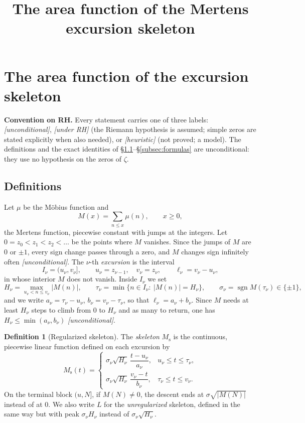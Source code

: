\documentclass[11pt,reqno]{amsart}
\theoremstyle{plain}
\theoremstyle{definition}
\newtheorem{definition}[theorem]{Definition}
\DeclareMathOperator{\sgn}{sgn}
\newcommand{\Ms}{M_{\mathrm{s}}}
\begin{document}
\title{The area function of the Mertens excursion skeleton}
\author{}
\date{}
\maketitle

\section{The area function of the excursion skeleton}
\label{sec:excursion-area}

\noindent\textbf{Convention on RH.} Every statement carries one of three
labels: \emph{[unconditional]}, \emph{[under RH]} (the Riemann hypothesis is
assumed; simple zeros are stated explicitly when also needed), or
\emph{[heuristic]} (not proved; a model). The definitions and the exact
identities of \S\ref{subsec:def}--\S\ref{subsec:formulas} are
unconditional: they use no hypothesis on the zeros of $\zeta$.

\subsection{Definitions}
\label{subsec:def}

Let $\mu$ be the Möbius function and
\[
  M(x)=\sum_{n\le x}\mu(n),\qquad x\ge 0,
\]
the Mertens function, piecewise constant with jumps at the integers. Let
$0=z_0<z_1<z_2<\dots$ be the points where $M$ vanishes. Since the jumps of
$M$ are $0$ or $\pm1$, every sign change passes through a zero, and $M$
changes sign infinitely often \emph{[unconditional]}. The $\nu$-th
\emph{excursion} is the interval
\[
  I_\nu=(u_\nu,v_\nu],\qquad u_\nu=z_{\nu-1},\quad v_\nu=z_\nu,
  \qquad \ell_\nu=v_\nu-u_\nu ,
\]
in whose interior $M$ does not vanish. Inside $I_\nu$ we set
\[
  H_\nu=\max_{u_\nu<n\le v_\nu}|M(n)|,\qquad
  \tau_\nu=\min\{n\in I_\nu:\ |M(n)|=H_\nu\},\qquad
  \sigma_\nu=\sgn M(\tau_\nu)\in\{\pm1\},
\]
and we write $a_\nu=\tau_\nu-u_\nu$, $b_\nu=v_\nu-\tau_\nu$, so that
$\ell_\nu=a_\nu+b_\nu$. Since $M$ needs at least $H_\nu$ steps to climb from
$0$ to $H_\nu$ and as many to return, one has
$H_\nu\le\min(a_\nu,b_\nu)$ \emph{[unconditional]}.

\begin{definition}[Regularized skeleton]
\label{def:Ms}
The \emph{skeleton} $\Ms$ is the continuous, piecewise linear function
defined on each excursion by
\[
  \Ms(t)=
  \begin{cases}
    \sigma_\nu\sqrt{H_\nu}\,\dfrac{t-u_\nu}{a_\nu}, & u_\nu\le t\le \tau_\nu,\\[2ex]
    \sigma_\nu\sqrt{H_\nu}\,\dfrac{v_\nu-t}{b_\nu}, & \tau_\nu\le t\le v_\nu .
  \end{cases}
\]
On the terminal block $(u,N]$, if $M(N)\neq0$, the descent ends at
$\sigma\sqrt{|M(N)|}$ instead of at $0$. We also write $L$ for the
\emph{unregularized} skeleton, defined in the same way but with peak
$\sigma_\nu H_\nu$ instead of $\sigma_\nu\sqrt{H_\nu}$.
\end{definition}
\end{document}
